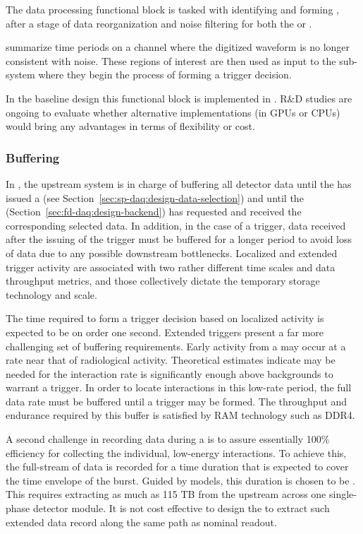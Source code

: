 The data processing functional block is tasked with identifying and forming , after a stage of data reorganization and noise filtering for both the  or .

 summarize time periods on a channel where the digitized waveform is no longer consistent with noise.
These regions of interest are then used as input to the  sub-system where they begin the process of forming a trigger decision.

In the baseline design this functional block is implemented in .
R\&D studies are ongoing to evaluate whether alternative implementations (in GPUs or CPUs) would bring any advantages in terms of flexibility or cost.

\subsubsection{Buffering}
\label{sec:fd-daq:upstream-buf}

In , the upstream  system is in charge of buffering all
detector data until the  has issued a 
(see Section~\ref{sec:sp-daq:design-data-selection}) and until the
 (Section~\ref{sec:fd-daq:design-backend}) has requested
and received the corresponding selected data. 
In addition, in the case of a  trigger, data received after
the issuing of the trigger must be buffered for a longer period to
avoid loss of data due to any possible downstream
bottlenecks. Localized and extended trigger activity are associated
with two rather different time scales and data throughput metrics, and
those collectively dictate the temporary storage technology and scale. 

The time required to form a trigger decision based on localized activity is expected to be on order one second.
Extended triggers present a far more challenging set of buffering requirements.  
Early activity from a  may occur at a rate near that of radiological activity.
Theoretical estimates indicate \snbpretime may be needed for the  interaction rate is significantly enough above backgrounds to warrant a trigger.
In order to locate interactions in this low-rate period, the full data rate must be buffered until a  trigger may be formed.
The throughput and endurance required by this buffer is satisfied by RAM technology such as DDR4.

A second challenge in recording data during a  is to assure essentially 100\% efficiency for collecting the individual, low-energy interactions. 
To achieve this, the full-stream of data is recorded for a time duration that is expected to cover the time envelope of the burst.
Guided by  models, this duration is chosen to be \snbtime.
This requires extracting as much as 115 TB from the  upstream  across one single-phase detector module.
It is not cost effective to design the  to extract such extended data record along the same path as nominal readout.

